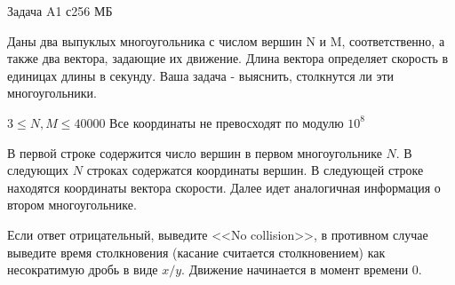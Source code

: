 \begin{problem}{Задача A}{1 с}{256 МБ}

Даны два выпуклых многоугольника с числом вершин N и M, соответственно,
а также два вектора, задающие их движение. Длина вектора определяет скорость
в единицах длины в секунду.
Ваша задача - выяснить, столкнутся ли эти многоугольники.

\Limit

$3 \le N, M \le 40000$
Все координаты не превосходят по модулю $10^8$

\InputFile
В первой строке содержится число вершин в первом многоугольнике $N$.
В следующих $N$ строках содержатся координаты вершин. В следующей строке
находятся координаты вектора скорости. Далее идет аналогичная информация
о втором многоугольнике.

\OutputFile
Если ответ отрицательный, выведите <<No collision>>, в противном случае
выведите время столкновения (касание считается столкновением) как несократимую
дробь в виде $x/y$. Движение начинается в момент времени $0$.

\Example
\begin{example}
\end{example}
\end{problem}
